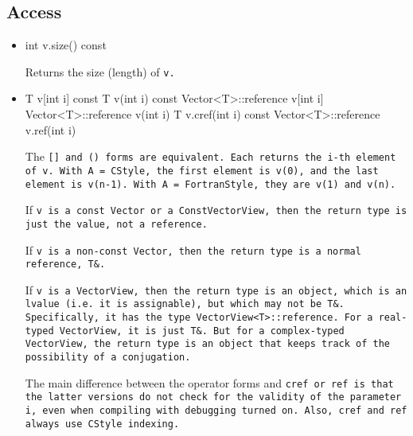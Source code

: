 \subsection{Access}
\label{Vector_Access}

\begin{itemize}
\item
\begin{tmvcode}
int v.size() const
\end{tmvcode}
Returns the size (length) of \tt{v}.

\item
\begin{tmvcode}
T v[int i] const
T v(int i) const
Vector<T>::reference v[int i]
Vector<T>::reference v(int i)
T v.cref(int i) const
Vector<T>::reference v.ref(int i)
\end{tmvcode}
The \tt{[]} and \tt{()} forms are equivalent.  Each returns the \tt{i}-th element of \tt{v}.  
With \tt{A = CStyle}, the first 
element is \tt{v(0)}, and the last element is \tt{v(n-1)}.
With \tt{A = FortranStyle}, they are \tt{v(1)} and \tt{v(n)}.

If \tt{v} is a 
\tt{const Vector} or a \tt{ConstVectorView},
then the return type is just the value, not a reference.

If \tt{v} is a 
non-\tt{const Vector}, then the return type is a normal reference, \tt{T\&}.

If \tt{v} is a \tt{VectorView}, then the return type is an object, which is
an lvalue (i.e. it is assignable), but which may not be \tt{T\&}.
Specifically, it has the type \tt{VectorView<T>::reference}.
For a real-typed \tt{VectorView}, it is just \tt{T\&}.  But for a
complex-typed \tt{VectorView}, the return type is an object that keeps track of the
possibility of a conjugation.

The main difference between the operator forms and \tt{cref} or \tt{ref} is that the latter versions do not
check for the validity of the parameter \tt{i}, even when compiling with debugging turned on.
Also, \tt{cref} and \tt{ref} always use \tt{CStyle} indexing.



\end{itemize}
